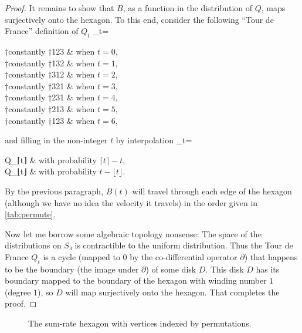 \documentclass[openany]{amsbook}
\numberwithin{equation}{chapter}
\numberwithin{figure}{chapter}
\numberwithin{table}{chapter}
\def\cas#1{\begin{cases*}#1\end{cases*}}
\def\[#1\]{\begin{equation*}{#1}\end{equation*}}
\theoremstyle{definition}	理dfn:Definition~?s			理exa:Example~?s
\theoremstyle{remark}		理cla:Claim~?s				理rem:Remark~?s
\begin{document}
\begin{proof}
		It remains to show that $B$, as a function in the distribution of $Q$,
		maps surjectively onto the hexagon.
		To this end, consider the following “Tour de France” definition of $Q_t$
		\[Q_t=\cas{
			†constantly †123	&	when $t=0$,	\\
			†constantly †132	&	when $t=1$,	\\
			†constantly †312	&	when $t=2$,	\\
			†constantly †321	&	when $t=3$,	\\
			†constantly †231	&	when $t=4$,	\\
			†constantly †213	&	when $t=5$,	\\
			†constantly †123	&	when $t=6$,
		}\]
		and filling in the non-integer $t$ by interpolation
		\[Q_t=\cas{
			Q_{⌈t⌉}	&	 with probability $⌈t⌉-t$,	\\
			Q_{⌊t⌋}	&	 with probability $t-⌊t⌋$.
		}\]
		By the previous paragraph, $B(t)$ will travel through each edge of the hexagon
		(although we have no idea the velocity it travels)
		in the order given in \cref{tab:permute}.
		
		Now let me borrow some algebraic topology nonsense:
		The space of the distributions on $S₃$
		is contractible to the uniform distribution.
		Thus the Tour de France $Q_t$ is a cycle
		(mapped to $0$ by the co-differential operator $∂$)
		that happens to be the boundary (the image under $∂$) of some disk $D$.
		This disk $D$ has its boundary mapped to the boundary of the hexagon with
		winding number $1$ (degree $1$), so $D$ will map surjectively onto the hexagon.
		That completes the proof.
	\end{proof}
	
	\begin{figure}
		\caption{
			The sum-rate hexagon with vertices indexed by permutations.
		}\label{fig:hexagon}
	\end{figure}
	
\end{document}
